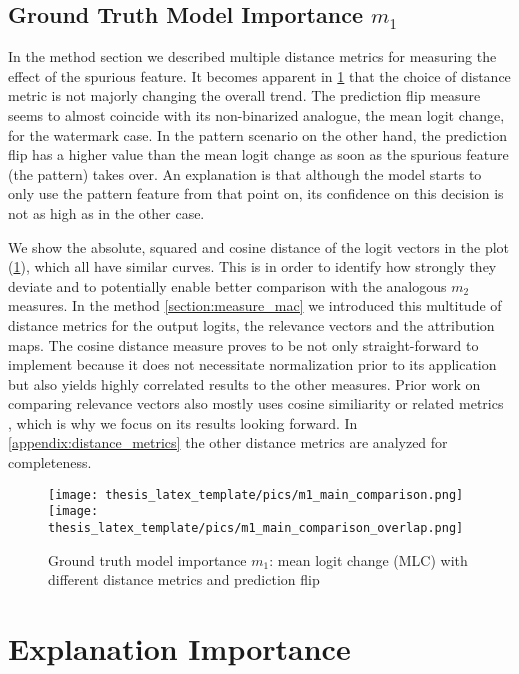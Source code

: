 \subsection{Ground Truth Model Importance $m_1$}
In the method section we described multiple distance metrics for measuring the effect of the spurious feature. It becomes apparent in \cref{fig:m1_results} that the choice of distance metric is not majorly changing the overall trend.
The prediction flip measure seems to almost coincide with its non-binarized analogue, the mean logit change, for the watermark case.
In the pattern scenario on the other hand, the prediction flip has a higher value than the mean logit change as soon as the spurious feature (the pattern) takes over. An explanation is that although the model starts to only use the pattern feature from that point on, its confidence on this decision is not as high as in the other case.

We show the absolute, squared and cosine distance of the logit vectors in the plot (\cref{fig:m1_results}), which all have similar curves. This is in order to identify how strongly they deviate and to potentially enable better comparison with the analogous $m_2$ measures.
In the method \cref{section:measure_mac} we introduced this multitude of distance metrics for the output logits, the relevance vectors and the attribution maps. The cosine distance measure proves to be not only straight-forward to implement because it does not necessitate normalization prior to its application but also yields highly correlated results to the other measures. 
Prior work on comparing relevance vectors also mostly uses cosine similiarity or related metrics \citep{Sixt2020, Achtibat2022,Achtibat2023, Dreyer2023a}, which is why we focus on its results looking forward.  
In \cref{appendix:distance_metrics} the other distance metrics are analyzed for completeness.

\begin{figure}[t!]
    \centering
    \texttt{[image: thesis\_latex\_template/pics/m1\_main\_comparison.png]}
    \texttt{[image: thesis\_latex\_template/pics/m1\_main\_comparison\_overlap.png]}
    \caption[Ground Truth Importance $m_1$]{Ground truth model importance $m_1$: mean logit change (MLC) with different distance metrics and prediction flip}
    \label{fig:m1_results}
\end{figure}

\section{Explanation Importance}

